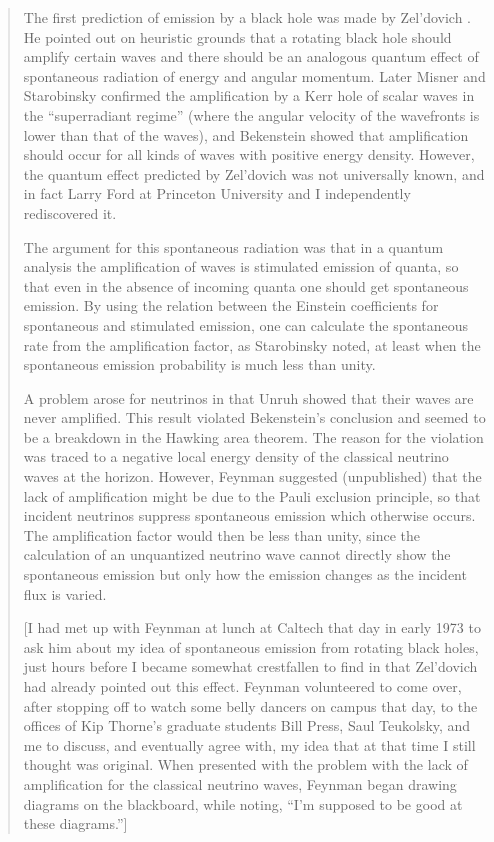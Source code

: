 \documentclass[12pt]{article} \usepackage{latexsym}
\begin{document}
\begin{quotation}
The first prediction of emission by a black hole was made by
Zel'dovich \cite{Zel1,Zel2}.  He pointed out on heuristic grounds that a
rotating black hole should amplify certain waves and there
should be an analogous quantum effect of spontaneous radiation of
energy and angular momentum.  Later Misner \cite{Mis} and Starobinsky
\cite{Star} confirmed the amplification by a Kerr hole of scalar waves
in the ``superradiant regime'' (where the angular velocity of the
wavefronts is lower than that of the waves), and Bekenstein
\cite{Beka} showed that amplification should occur for all kinds of
waves with positive energy density.  However, the quantum effect
predicted by Zel'dovich was not universally known, and in fact Larry
Ford at Princeton University and I independently rediscovered it.

The argument for this spontaneous radiation was that in a quantum
analysis the amplification of waves is stimulated emission of quanta,
so that even in the absence of incoming quanta one should get
spontaneous emission.  By using the relation between the Einstein
coefficients for spontaneous and stimulated emission, one can
calculate the spontaneous rate from the amplification factor, as
Starobinsky \cite{Star} noted, at least when the spontaneous emission
probability is much less than unity.

A problem arose for neutrinos in that Unruh \cite{Unruh73} showed that
their waves are never amplified.  This result violated Bekenstein's
conclusion and seemed to be a breakdown in the Hawking \cite{Hawkingarea}
area theorem.  The reason for the violation was traced to a negative
local energy density of the classical neutrino waves at the horizon.
However, Feynman suggested (unpublished) that the lack of
amplification might be due to the Pauli exclusion principle, so that
incident neutrinos suppress spontaneous emission which otherwise
occurs.  The amplification factor would then be less than unity, since
the calculation of an unquantized neutrino wave cannot directly show
the spontaneous emission but only how the emission changes as the
incident flux is varied.

[I had met up with Feynman at lunch at Caltech that day in early 1973
to ask him about my idea of spontaneous emission from rotating black
holes, just hours before I became somewhat crestfallen to find in
\cite{Zel1} that Zel'dovich had already pointed out this effect.
Feynman volunteered to come over, after stopping off to watch some
belly dancers on campus that day, to the offices of Kip Thorne's
graduate students Bill Press, Saul Teukolsky, and me to discuss, and
eventually agree with, my idea that at that time I still thought was
original.  When presented with the problem with the lack of
amplification for the classical neutrino waves, Feynman began drawing
diagrams on the blackboard, while noting, ``I'm supposed to be good at
these diagrams.'']


\end{quotation}
\end{document}
